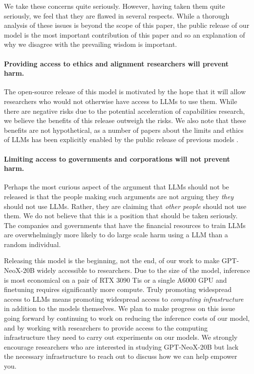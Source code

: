\documentclass[11pt]{article}
\newcommand{\model}{GPT-NeoX-20B}
\begin{document}
We take these concerns quite seriously. However, having taken them quite seriously, we feel that they are flawed in several respects. While a thorough analysis of these issues is beyond the scope of this paper, the public release of our model is the most important contribution of this paper and so an explanation of why we disagree with the prevailing wisdom is important.

\paragraph{Providing access to ethics and alignment researchers will prevent harm.} The open-source release of this model is motivated by the hope that it will allow researchers who would not otherwise have access to LLMs to use them. While there are negative risks due to the potential acceleration of capabilities research, we believe the benefits of this release outweigh the risks. We also note that these benefits are not hypothetical, as a number of papers about the limits and ethics of LLMs has been explicitly enabled by the public release of previous models \citep{zhang2021counterfactual,kandpal2022deduplicating,carlini2022quantifying,birhane2021multimodal,logit-lens,meng2022locating, lin2021truthfulqa}.

\paragraph{Limiting access to governments and corporations will not prevent harm.} Perhaps the most curious aspect of the argument that LLMs should not be released is that the people making such arguments are not arguing they \textit{they} should not use LLMs. Rather, they are claiming that \textit{other people} should not use them. We do not believe that this is a position that should be taken seriously. The companies and governments that have the financial resources to train LLMs are overwhelmingly more likely to do large scale harm using a LLM than a random individual.

Releasing this model is the beginning, not the end, of our work to make \model{} widely accessible to researchers. Due to the size of the model, inference is most economical on a pair of RTX 3090 Tis or a single A6000 GPU and finetuning requires significantly more compute. Truly promoting widespread access to LLMs means promoting widespread access to \textit{computing infrastructure} in addition to the models themselves. We plan to make progress on this issue going forward by continuing to work on reducing the inference costs of our model, and by working with researchers to provide access to the computing infrastructure they need to carry out experiments on our models. We strongly encourage researchers who are interested in studying \model{} but lack the necessary infrastructure to reach out to discuss how we can help empower you.
\end{document}
